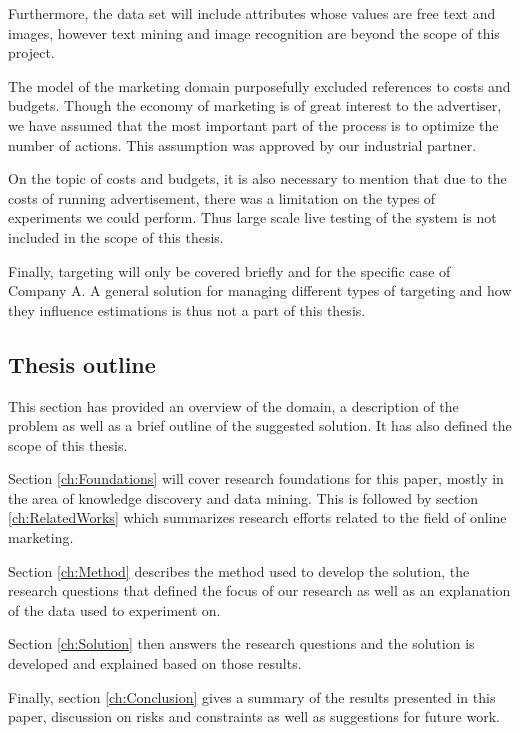 \documentclass{sig-alternate}
\begin{document}
Furthermore, the data set will include attributes whose values are free text and images, however text mining and image recognition are beyond the scope of this project.

The model of the marketing domain purposefully excluded references to costs and budgets. Though the economy of marketing is of great interest to the advertiser, we have assumed that the most important part of the process is to optimize the number of actions. This assumption was approved by our industrial partner.

On the topic of costs and budgets, it is also necessary to mention that due to the costs of running advertisement, there was a limitation on the types of experiments we could perform. Thus large scale live testing of the system is not included in the scope of this thesis.

Finally, targeting will only be covered briefly and for the specific case of Company A. A general solution for managing different types of targeting and how they influence estimations is thus not a part of this thesis.

\subsection{Thesis outline}
This section has provided an overview of the domain, a description of the problem as well as a brief outline of the suggested solution. It has also defined the scope of this thesis.

Section \ref{ch:Foundations} will cover research foundations for this paper, mostly in the area of knowledge discovery and data mining. This is followed by section \ref{ch:RelatedWorks} which summarizes research efforts related to the field of online marketing.

Section \ref{ch:Method} describes the method used to develop the solution, the research questions that defined the focus of our research as well as an explanation of the data used to experiment on.

Section \ref{ch:Solution} then answers the research questions and the solution is developed and explained based on those results.

Finally, section \ref{ch:Conclusion} gives a summary of the results presented in this paper, discussion on risks and constraints as well as suggestions for future work.
\end{document}
